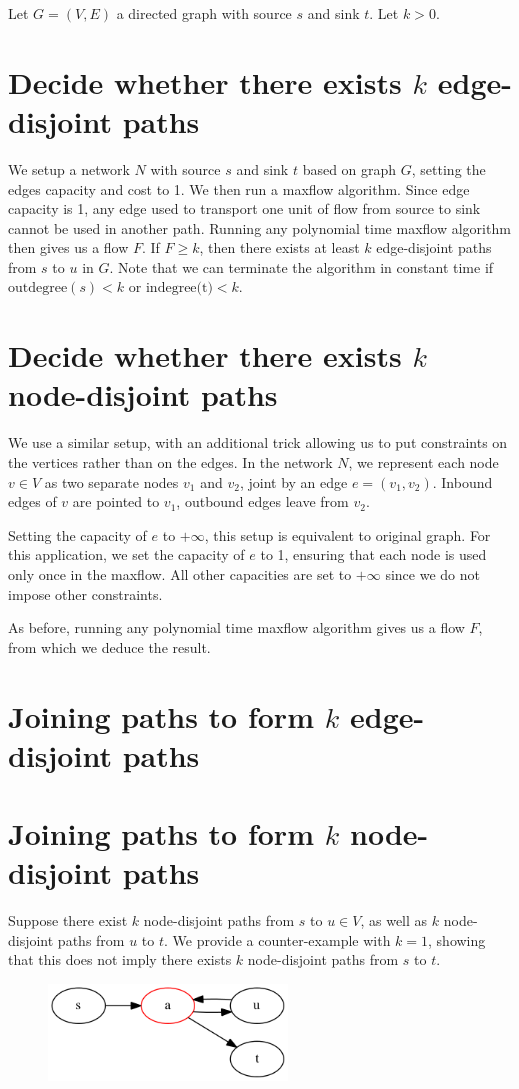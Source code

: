 Let $G = (V, E)$ a directed graph with source $s$ and sink $t$. Let $k > 0$.


\section{Decide whether there exists $k$ \textbf{edge}-disjoint paths}
We setup a network $N$ with source $s$ and sink $t$ based on graph $G$, setting the edges capacity and cost to 1. We then run a maxflow algorithm. Since edge capacity is 1, any edge used to transport one unit of flow from source to sink cannot be used in another path. Running any polynomial time maxflow algorithm then gives us a flow $F$. If $F \geq k$, then there exists at least $k$ edge-disjoint paths from $s$ to $u$ in $G$. Note that we can terminate the algorithm in constant time if $\text{outdegree}(s) < k$ or $\text{indegree(t)} < k$.

\section{Decide whether there exists $k$ \textbf{node}-disjoint paths}
We use a similar setup, with an additional trick allowing us to put constraints on the vertices rather than on the edges. In the network $N$, we represent each node $v \in V$ as two separate nodes $v_1$ and $v_2$, joint by an edge $e = (v_1, v_2)$. Inbound edges of $v$ are pointed to $v_1$, outbound edges leave from $v_2$.

Setting the capacity of $e$ to $+\infty$, this setup is equivalent to original graph. For this application, we set the capacity of $e$ to 1, ensuring that each node is used only once in the maxflow. All other capacities are set to $+\infty$ since we do not impose other constraints.

As before, running any polynomial time maxflow algorithm gives us a flow $F$, from which we deduce the result.

\section{Joining paths to form $k$ \textbf{edge}-disjoint paths}

\section{Joining paths to form $k$ \textbf{node}-disjoint paths}
Suppose there exist $k$ node-disjoint paths from $s$ to $u \in V$, as well as $k$ node-disjoint paths from $u$ to $t$. We provide a counter-example with $k = 1$, showing that this does not imply there exists $k$ node-disjoint paths from $s$ to $t$.

\begin{figure}[ht]
  \center
  \includegraphics[width=2.5in]{figures/3-4-graph.png}
\end{figure}

